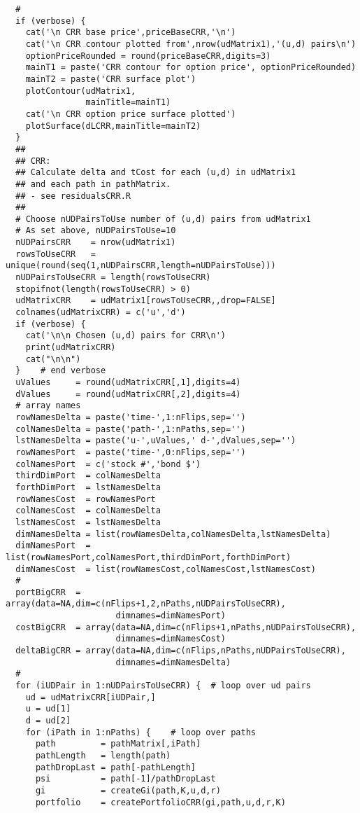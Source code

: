 \documentclass[10pt]{article}
\begin{document}
\begin{verbatim}
  #
  if (verbose) {
    cat('\n CRR base price',priceBaseCRR,'\n')
    cat('\n CRR contour plotted from',nrow(udMatrix1),'(u,d) pairs\n')
    optionPriceRounded = round(priceBaseCRR,digits=3)
    mainT1 = paste('CRR contour for option price', optionPriceRounded)
    mainT2 = paste('CRR surface plot')
    plotContour(udMatrix1,
                mainTitle=mainT1)
    cat('\n CRR option price surface plotted')
    plotSurface(dLCRR,mainTitle=mainT2)
  }
  ##
  ## CRR:
  ## Calculate delta and tCost for each (u,d) in udMatrix1
  ## and each path in pathMatrix.
  ## - see residualsCRR.R
  ##
  # Choose nUDPairsToUse number of (u,d) pairs from udMatrix1
  # As set above, nUDPairsToUse=10
  nUDPairsCRR    = nrow(udMatrix1)
  rowsToUseCRR   = unique(round(seq(1,nUDPairsCRR,length=nUDPairsToUse)))
  nUDPairsToUseCRR = length(rowsToUseCRR)
  stopifnot(length(rowsToUseCRR) > 0)
  udMatrixCRR    = udMatrix1[rowsToUseCRR,,drop=FALSE]
  colnames(udMatrixCRR) = c('u','d')
  if (verbose) {
    cat('\n\n Chosen (u,d) pairs for CRR\n')
    print(udMatrixCRR)
    cat("\n\n")
  }    # end verbose
  uValues     = round(udMatrixCRR[,1],digits=4)
  dValues     = round(udMatrixCRR[,2],digits=4)
  # array names
  rowNamesDelta = paste('time-',1:nFlips,sep='')
  colNamesDelta = paste('path-',1:nPaths,sep='')
  lstNamesDelta = paste('u-',uValues,' d-',dValues,sep='')
  rowNamesPort  = paste('time-',0:nFlips,sep='')
  colNamesPort  = c('stock #','bond $')
  thirdDimPort  = colNamesDelta
  forthDimPort  = lstNamesDelta
  rowNamesCost  = rowNamesPort
  colNamesCost  = colNamesDelta
  lstNamesCost  = lstNamesDelta
  dimNamesDelta = list(rowNamesDelta,colNamesDelta,lstNamesDelta)
  dimNamesPort  = list(rowNamesPort,colNamesPort,thirdDimPort,forthDimPort)
  dimNamesCost  = list(rowNamesCost,colNamesCost,lstNamesCost)
  #
  portBigCRR  = array(data=NA,dim=c(nFlips+1,2,nPaths,nUDPairsToUseCRR),
                      dimnames=dimNamesPort)
  costBigCRR  = array(data=NA,dim=c(nFlips+1,nPaths,nUDPairsToUseCRR),
                      dimnames=dimNamesCost)
  deltaBigCRR = array(data=NA,dim=c(nFlips,nPaths,nUDPairsToUseCRR),
                      dimnames=dimNamesDelta)
  #
  for (iUDPair in 1:nUDPairsToUseCRR) {  # loop over ud pairs
    ud = udMatrixCRR[iUDPair,]
    u = ud[1]
    d = ud[2]
    for (iPath in 1:nPaths) {    # loop over paths
      path         = pathMatrix[,iPath]
      pathLength   = length(path)
      pathDropLast = path[-pathLength]
      psi          = path[-1]/pathDropLast
      gi           = createGi(path,K,u,d,r)
      portfolio    = createPortfolioCRR(gi,path,u,d,r,K)

\end{verbatim}
\end{document}
